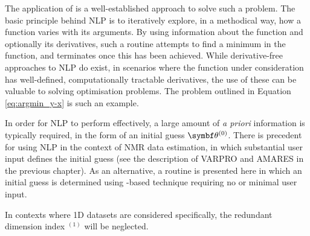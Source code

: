 The application of  is a well-established approach to solve such a
problem\cite{Fletcher1987,Nocedal2006}. The basic principle behind \ac{NLP} is
to iteratively explore, in a methodical way, how a function varies with its
arguments. By using information about the function and optionally its
derivatives, such a routine attempts to find a minimum in the function, and
terminates once this has been achieved. While derivative-free approaches to
\ac{NLP} do exist, in scenarios where the function under consideration has well-defined,
computationally tractable derivatives, the use of these can be valuable to
solving optimisation problems. The problem outlined in Equation
\ref{eq:argmin_y-x} is such an example.

In order for \ac{NLP} to perform effectively, a large amount of \textit{a
priori} information is typically required, in the form of an initial guess
$\bthzero$. There is precedent for using \ac{NLP} in the context of \ac{NMR}
data estimation, in which substantial user input defines the initial guess (see
the description of \ac{VARPRO} and \ac{AMARES} in the previous chapter). As an
alternative, a routine is presented here in which an initial guess is determined
using -based technique requiring no or minimal user input.



\begin{remark}
    In contexts where \ac{1D} datasets are considered specifically, the
    redundant dimension index $^{(1)}$ will be neglected.
\end{remark}
